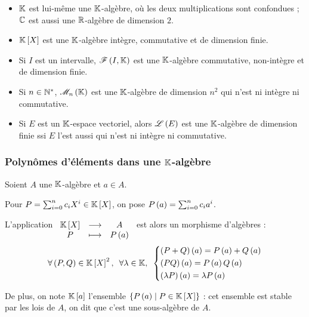 \begin{ex}
\begin{itemize}
    \item \(\mathbb{K}\) est lui-même une \(\mathbb{K}\)-algèbre, où les deux multiplications sont confondues ; \(\mathbb{C}\) est aussi une \(\mathbb{R}\)-algèbre de dimension \(2\). \\
    \item \(\poly\) est une \(\mathbb{K}\)-algèbre intègre, commutative et de dimension finie. \\
    \item Si \(I\) est un intervalle, \(\mathscr{F}\left(I,\mathbb{K}\right)\) est une \(\mathbb{K}\)-algèbre commutative, non-intègre et de dimension finie. \\
    \item Si \(n\in\mathbb{N}^*\), \(\M{n}\) est une \(\mathbb{K}\)-algèbre de dimension \(n^2\) qui n'est ni intègre ni commutative. \\
    \item Si \(E\) est un \(\mathbb{K}\)-espace vectoriel, alors \(\mathscr{L}\left(E\right)\) est une \(\mathbb{K}\)-algèbre de dimension finie ssi \(E\) l'est aussi qui n'est ni intègre ni commutative.
\end{itemize}
\end{ex}

\subsubsection{Polynômes d'éléments dans une \(\mathbb{K}\)-algèbre}

\begin{prop}
Soient \(A\) une \(\mathbb{K}\)-algèbre et \(a\in A\).

Pour \(P=\sum_{i=0}^nc_iX^i\in\poly\), on pose \(P\left(a\right)=\sum_{i=0}^nc_ia^i\).

L'application \(\fonctionlambda{\poly}{A}{P}{P\paren{a}}\) est alors un morphisme d'algèbres : \[\quantifs{\forall\paren{P,Q}\in\poly^2;\forall\lambda\in\K}\begin{dcases}
\paren{P+Q}\paren{a}=P\paren{a}+Q\paren{a} \\
\paren{PQ}\paren{a}=P\paren{a}Q\paren{a} \\
\paren{\lambda P}\paren{a}=\lambda P\paren{a}
\end{dcases}\]

De plus, on note \(\poly[\K][a]\) l'ensemble \(\accol{P\paren{a}\tq P\in\poly}\) : cet ensemble est stable par les lois de \(A\), on dit que c'est une sous-algèbre de \(A\).
\end{prop}

